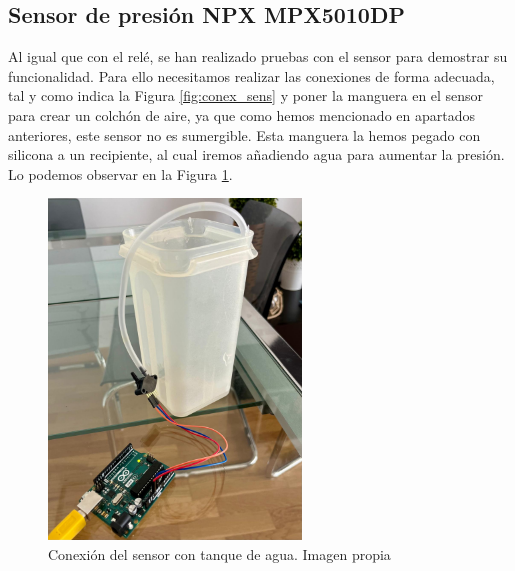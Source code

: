 \subsection{Sensor de presión NPX MPX5010DP}
Al igual que con el relé, se han realizado pruebas con el sensor para demostrar su funcionalidad. Para ello necesitamos realizar las conexiones de forma adecuada, tal y como indica la Figura \ref{fig:conex_sens} y poner la manguera en el sensor para crear un colchón de aire, ya que como hemos mencionado en apartados anteriores, este sensor no es sumergible. Esta manguera la hemos pegado con silicona a un recipiente, al cual iremos añadiendo agua para aumentar la presión. Lo podemos observar en la Figura \ref{fig:conex_sen_tanq}.
\begin{figure}[h]
    \centering
    \includegraphics[width=0.6\textwidth]{img/sensortanque.jpg}
    \caption{Conexión del sensor con tanque de agua. Imagen propia}
    \label{fig:conex_sen_tanq}
\end{figure}

